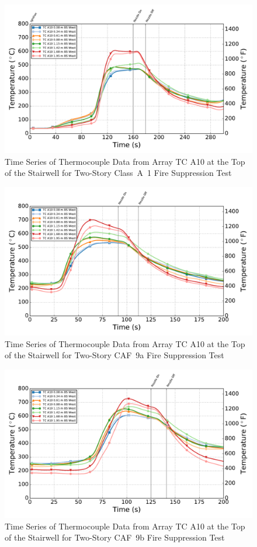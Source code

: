 \documentclass[12pt,oneside]{book}
\begin{document}
\begin{figure}[!ht]
	\includegraphics[width=.85\columnwidth]{../Figures/Script_Figures/Test_41a_West_061415_TC_A10}
	\caption{Time Series of Thermocouple Data from Array TC A10 at the Top of the Stairwell for Two-Story Class~A~1 Fire Suppression Test}
	\label{fig:app_classa1_tca10}
\end{figure}

\begin{figure}[!ht]
	\includegraphics[width=.85\columnwidth]{../Figures/Script_Figures/Test_41_West_061415_TC_A10}
	\caption{Time Series of Thermocouple Data from Array TC A10 at the Top of the Stairwell for Two-Story CAF~9a Fire Suppression Test}
	\label{fig:app_caf9a_tca10}
\end{figure}


\begin{figure}[!ht]
	\includegraphics[width=.85\columnwidth]{../Figures/Script_Figures/Test_41c_West_061415_TC_A10}
	\caption{Time Series of Thermocouple Data from Array TC A10 at the Top of the Stairwell for Two-Story CAF~9b Fire Suppression Test}
	\label{fig:app_caf9b_tca10}
\end{figure}
\end{document}
